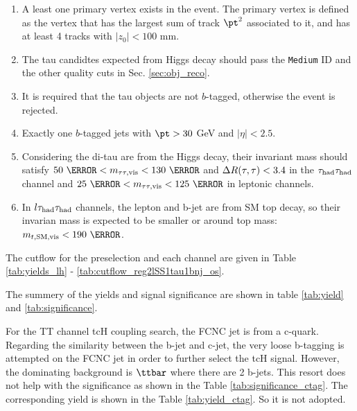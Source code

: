 \begin{enumerate}
\item A least one primary vertex exists in the event. The primary vertex is defined as the vertex that has the largest sum of track $\pt^2$ associated to it, and has at least 4 tracks with $|z_0|<100$ mm.
\item The tau candidtes expected from Higgs decay should pass the \texttt{Medium} ID and the other quality cuts in Sec. \ref{sec:obj_reco}.
\item It is required that the tau objects are not $b$-tagged, otherwise the event is rejected.
\item Exactly one $b$-tagged jets with $\pt>30$ GeV and $|\eta|<2.5$. 
\item Considering the di-tau are from the Higgs decay, their invariant mass should satisfy $50~\GeV<\ttvismass<130~\GeV$ and $\Delta R(\tau,\tau)<3.4$ in the $\tau_\text{had}{}\tau_\text{had}$ channel and $25~\GeV<\ttvismass<125~\GeV$ in leptonic channels.
\item  In $l\tau_\text{had}{}\tau_\text{had}$ channels, the lepton and b-jet are from SM top decay, so their invarian mass is expected to be smaller or around top mass: $\tlvismass<190~\GeV$.
\end{enumerate}



The cutflow for the preselection and each channel are given in Table \ref{tab:yields_lh} - \ref{tab:cutflow_reg2lSS1tau1bnj_os}.

The summery of the yields and signal significance are shown in table \ref{tab:yield} and \ref{tab:significance}.

For the TT channel tcH coupling search, the FCNC jet is from a c-quark. Regarding the similarity between the b-jet and c-jet, the very loose b-tagging is attempted on the FCNC jet in order to further select the tcH signal. However, the dominating background is $\ttbar$ where there are 2 b-jets. This resort does not help with the significance as shown in the Table \ref{tab:significance_ctag}. The corresponding yield is shown in the Table \ref{tab:yield_ctag}. So it is not adopted.

